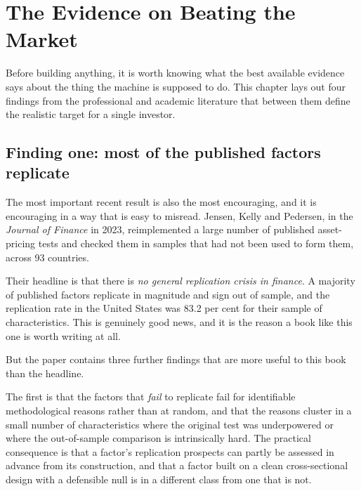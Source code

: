 
\chapter{The Evidence on Beating the Market}
\label{ch:evidence-beating}

Before building anything, it is worth knowing what the best available
evidence says about the thing the machine is supposed to do. This chapter
lays out four findings from the professional and academic literature that
between them define the realistic target for a single investor.

\section{Finding one: most of the published factors replicate}

The most important recent result is also the most encouraging, and it is
encouraging in a way that is easy to misread. Jensen, Kelly and Pedersen,
in the \emph{Journal of Finance} in 2023, reimplemented a large number of
published asset-pricing tests and checked them in samples that had not
been used to form them, across 93 countries.

Their headline is that there is \emph{no general replication crisis in
finance}. A majority of published factors replicate in magnitude and sign
out of sample, and the replication rate in the United States was 83.2 per
cent for their sample of characteristics. This is genuinely good news, and
it is the reason a book like this one is worth writing at all.

But the paper contains three further findings that are more useful to this
book than the headline.

The first is that the factors that \emph{fail} to replicate fail for
identifiable methodological reasons rather than at random, and that the
reasons cluster in a small number of characteristics where the original
test was underpowered or where the out-of-sample comparison is intrinsically
hard. The practical consequence is that a factor's replication prospects
can partly be assessed in advance from its construction, and that a factor
built on a clean cross-sectional design with a defensible null is in a
different class from one that is not.

